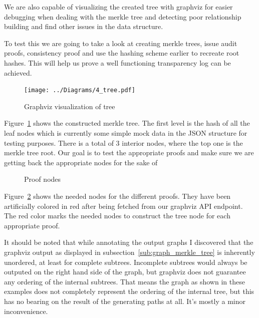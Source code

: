 \documentclass[../Main/thesis.tex]{subfiles}
\begin{document}
We are also capable of visualizing the created tree with graphviz for easier
debugging when dealing with the merkle tree and detecting poor relationship
building and find other issues in the data structure.

To test this we are going to take a look at creating merkle trees, issue audit
proofs, consistency proof and use the hashing scheme earlier to recreate root
hashes. This will help us prove a well functioning transparency log can be
achieved.

\begin{figure}[H]
\centering
\texttt{[image: ../Diagrams/4\_tree.pdf]}
\caption{Graphviz visualization of tree}
\label{fig:graph}
\end{figure}


Figure~\ref{fig:graph} shows the constructed merkle tree. The first level is the
hash of all the leaf nodes which is currently some simple mock data in the JSON
structure for testing purposes. There is a total of 3 interior nodes, where the
top one is the merkle tree root. Our goal is to test the appropriate proofs and
make sure we are getting back the appropriate nodes for the sake of 

\begin{figure}[H]
\centering
{}
\qquad
{}
\caption{Proof nodes}
\label{fig:test_proof}
\end{figure}

Figure~\ref{fig:test_proof} shows the needed nodes for the different proofs.
They have been artificially colored in red after being fetched from our graphviz
API endpoint. The red color marks the needed nodes to construct the tree node
for each appropriate proof. 

It should be noted that while annotating the output graphs I discovered that the graphviz
output as displayed in subsection~\ref{sub:graph_merkle_tree} is inherently
unordered, at least for complete subtrees. Incomplete subtrees would always be
outputed on the right hand side of the graph, but graphviz does not guarantee
any ordering of the internal subtrees. That means the graph as shown in these
examples does not completely represent the ordering of the internal tree, but
this has no bearing on the result of the generating paths at all. It's mostly a
minor inconvenience.
\end{document}
